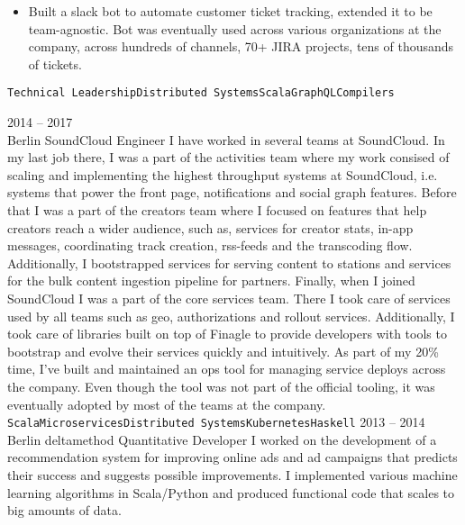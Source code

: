 \documentclass[9pt]{developercv} %
\begin{document}
\begin{entrylist}
{\begin{itemize}
				\item Built a slack bot to automate customer ticket tracking, extended it to be team-agnostic. Bot was eventually used across various organizations at the company, across hundreds of channels, 70+ JIRA projects, tens of thousands of tickets.
			\end{itemize}
			\texttt{Technical Leadership}\slashsep\texttt{Distributed Systems}\slashsep\texttt{Scala}\slashsep\texttt{GraphQL}\slashsep\texttt{Compilers}
		}
	\entry
		{2014 -- 2017\\\footnotesize{Berlin}}
		{SoundCloud}
		{Engineer}
		{
			I have worked in several teams at SoundCloud. In my last job there, I was a part of the activities team where my work consised of scaling and implementing the highest throughput systems at SoundCloud, i.e. systems that power the front page, notifications and social graph features.\newline\newline
			Before that I was a part of the creators team where I focused on features that help creators reach a wider audience, such as, services for creator stats, in-app messages, coordinating track creation, rss-feeds and the transcoding flow. Additionally, I bootstrapped services for serving content to stations and services for the bulk content ingestion pipeline for partners.\newline\newline
			Finally, when I joined SoundCloud I was a part of the core services team. There I took care of services used by all teams such as geo, authorizations and rollout services. Additionally, I took care of libraries built on top of Finagle to provide developers with tools to bootstrap and evolve their services quickly and intuitively.\newline\newline
			As part of my 20\% time, I've built and maintained an ops tool for managing service deploys across the company. Even though the tool was not part of the official tooling, it was eventually adopted by most of the teams at the company.\\
			\texttt{Scala}\slashsep\texttt{Microservices}\slashsep\texttt{Distributed Systems}\slashsep\texttt{Kubernetes}\slashsep\texttt{Haskell}}
	\entry
		{2013 -- 2014\\\footnotesize{Berlin}}
		{deltamethod}
		{Quantitative Developer}
		{
			I worked on the development of a recommendation system for improving online ads and ad campaigns that predicts their success and suggests possible improvements. I implemented various machine learning algorithms in Scala/Python and produced functional code that scales to big amounts of data.
}
\end{entrylist}
\end{document}
